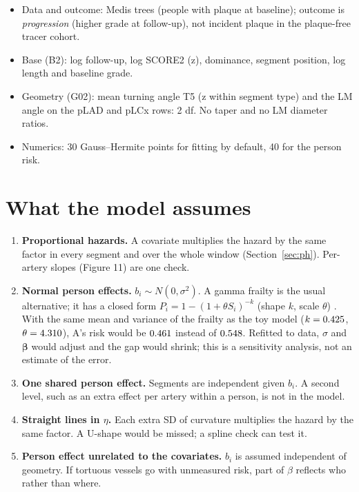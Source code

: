 \documentclass[11pt,a4paper]{article}
\begin{document}
\begin{tcolorbox}[colback=cWarn!4,colframe=cWarn,title=Where the current code differs (\texttt{progression\_who\_pooled.py})]
\begin{itemize}
\item Data and outcome: Medis trees (people with plaque at baseline); outcome is \emph{progression} (higher grade at
follow-up), not incident plaque in the plaque-free tracer cohort.
\item Base (B2): log follow-up, log SCORE2 (z), dominance, segment position, log length and baseline grade.
\item Geometry (G02): mean turning angle T5 (z within segment type) and the LM angle on the pLAD and pLCx rows: 2 df.
No taper and no LM diameter ratios.
\item Numerics: 30 Gauss--Hermite points for fitting by default, 40 for the person risk.
\end{itemize}
\end{tcolorbox}

\section{What the model assumes}
\label{sec:assume}

\begin{enumerate}
\item \textbf{Proportional hazards.} A covariate multiplies the hazard by the same factor in every segment and over the whole
window (Section~\ref{sec:ph}). Per-artery slopes (Figure 11) are one check.
\item \textbf{Normal person effects.} $b_i\sim N(0,\sigma^2)$. A gamma frailty is the usual alternative; it has a closed form
$P_i = 1-(1+\theta S_i)^{-k}$ (shape $k$, scale $\theta$) \cite{duchateau2008frailty}. With the same mean and variance of the
frailty as the toy model ($k = 0.425$, $\theta = 4.310$), A's risk would be $0.461$ instead of $0.548$.
Refitted to data, $\sigma$ and $\bm\beta$ would adjust and the gap would shrink; this is a sensitivity analysis, not an
estimate of the error.
\item \textbf{One shared person effect.} Segments are independent given $b_i$. A second level, such as an extra effect per
artery within a person, is not in the model.
\item \textbf{Straight lines in $\eta$.} Each extra SD of curvature multiplies the hazard by the same factor. A U-shape would
be missed; a spline check can test it.
\item \textbf{Person effect unrelated to the covariates.} $b_i$ is assumed independent of geometry. If tortuous vessels go
with unmeasured risk, part of $\beta$ reflects who rather than where.
\end{enumerate}
\end{document}
